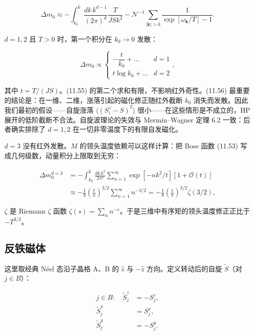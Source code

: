 \begin{equation*}
\Delta m _ {0} \approx - \int_{k _ {0}} ^ {\bar {k}} \frac {d k \, k ^ {d - 1}}{( 2 \pi ) ^ {d}} \frac {T}{J S k ^ {2}} - \mathcal {N} ^ {- 1} \sum_{| \mathbf {k} | > \bar {k}} \frac {1}{\exp [ \omega_ {\mathbf {k}} / T ] - 1}.
\tag{11.55}
\end{equation*}

$d = 1, 2$ 且 $T > 0$ 时，第一个积分在 $k_{0} \to 0$ 发散：

\begin{equation*}
\Delta m _ {0} \propto \left\{ \begin{array}{ll} - \dfrac {t}{k _ {0}} + \dots & d = 1 \\[4pt] t \log k _ {0} + \dots & d = 2 \end{array} \right. ,
\tag{11.56}
\end{equation*}

其中 $t = T/(JS)$。(11.55) 的第二个求和有限，不影响红外奇性。(11.56) 最重要的结论是：在一维、二维，涨落引起的磁化修正随红外截断 $k_{0}$ 消失而发散。因此我们最初的假设——自旋涨落 $\langle(S_{i}^{z} - S)^{2}\rangle$ 很小——在这些情形是不成立的，HP 展开的低阶截断不合法。自旋波理论的失效与 Mermin--Wagner 定理 6.2 一致：后者确实排除了 $d=1,2$ 在一切非零温度下的有限自发磁化。

$d = 3$ 没有红外发散。$M$ 的领头温度依赖可以这样计算：把 Bose 函数 (11.53) 写成几何级数，动量积分上限取到无穷：

\begin{align*}
\Delta m _ {0} ^ {d = 3} & = - \int_{k _ {0}} ^ {\bar {k}} \frac {d k \, k ^ {2}}{2 \pi^ {2}} \sum_ {n = 1} ^ {\infty} \exp [ - n k ^ {2} / t ] \left[ 1 + \mathcal {O} ( t ) \right]\\
& \approx - \frac {1}{8} \left( \frac {t}{\pi} \right) ^ {3/2} \sum_ {n = 1} ^ {\infty} n ^ {- 3/2} = - \frac {1}{8} \left( \frac {t}{\pi} \right) ^ {3/2} \zeta ( 3/2 ) ,
\tag{11.57}
\end{align*}

$\zeta$ 是 Riemann $\zeta$ 函数 $\zeta(s)=\sum_{n}n^{-s}$。于是三维中有序矩的领头温度修正正比于 $-T^{3/2}$。

\subsection{反铁磁体}

这里取经典 Néel 态沿子晶格 A、B 的 $\hat{z}$ 与 $-\hat{z}$ 方向。定义转动后的自旋 $\tilde{S}$（对 $j \in B$）：

\begin{align*}
j \in B :\quad \tilde {S} _ {j} ^ {z} & = - S _ {j} ^ {z} ,\\
\tilde {S} _ {j} ^ {x} & = S _ {j} ^ {x} ,\\
\tilde {S} _ {j} ^ {y} & = - S _ {j} ^ {y} .
\tag{11.58}
\end{align*}

